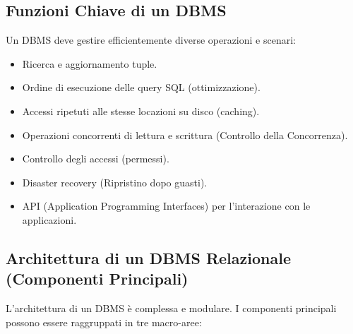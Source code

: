 \subsection{Funzioni Chiave di un DBMS}
Un DBMS deve gestire efficientemente diverse operazioni e scenari:
\begin{itemize}
    \item Ricerca e aggiornamento tuple.
    \item Ordine di esecuzione delle query SQL (ottimizzazione).
    \item Accessi ripetuti alle stesse locazioni su disco (caching).
    \item Operazioni concorrenti di lettura e scrittura (Controllo della Concorrenza).
    \item Controllo degli accessi (permessi).
    \item Disaster recovery (Ripristino dopo guasti).
    \item API (Application Programming Interfaces) per l'interazione con le applicazioni.
\end{itemize}

\subsection{Architettura di un DBMS Relazionale (Componenti Principali)}
L'architettura di un DBMS è complessa e modulare. I componenti principali possono essere raggruppati in tre macro-aree:

